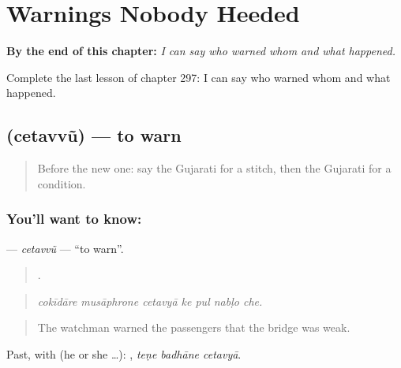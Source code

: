 
\chapter{Warnings Nobody Heeded}
\label{ch:gu-warnings-nobody-heeded}

\begin{chapteropening}
\textbf{By the end of this chapter:} \emph{I can say who warned whom and what happened.}

Complete the last lesson of chapter 297: I can say who warned whom and what happened.
\end{chapteropening}

\section[\texorpdfstring{\gu{ચેતવવું} (cetavvũ)}{ચેતવવું (cetavvũ)}]{ (cetavvũ) — to warn}

\label{lesson:GU-C297-cetavvu}



\begin{quote}
Before the new one: say the Gujarati for a stitch, then the Gujarati for a condition.
\end{quote}

\subsection*{You'll want to know: }
\textbf{} — \emph{cetavvũ} — \textquotedblleft{}to warn\textquotedblright{}.

\begin{quote}
      .
\end{quote}

\begin{quote}
\emph{cokīdāre musāphrone cetavyā ke pul nabḷo che.}
\end{quote}

\begin{quote}
The watchman warned the passengers that the bridge was weak.
\end{quote}

Past, with  (he or she …):   , \emph{teṇe badhāne cetavyā}.

